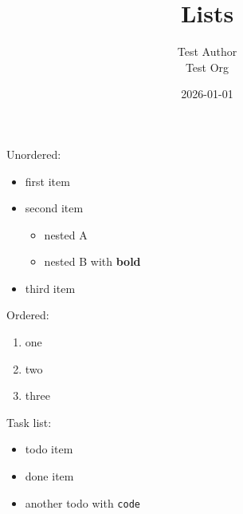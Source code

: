 \documentclass[11pt,a4paper]{article}
\title{Lists}
\author{Test Author \\ Test Org}
\date{2026-01-01}
\theoremstyle{definition}
\begin{document}
\maketitle

Unordered:


\begin{itemize}
  \item first item
  \item second item

\begin{itemize}
  \item nested A
  \item nested B with \textbf{bold}
\end{itemize}
  \item third item
\end{itemize}


Ordered:


\begin{enumerate}
  \item one
  \item two
  \item three
\end{enumerate}


Task list:


\begin{itemize}
  \item[$\square$] todo item
  \item[$\boxtimes$] done item
  \item[$\square$] another todo with \texttt{code}
\end{itemize}
\end{document}

